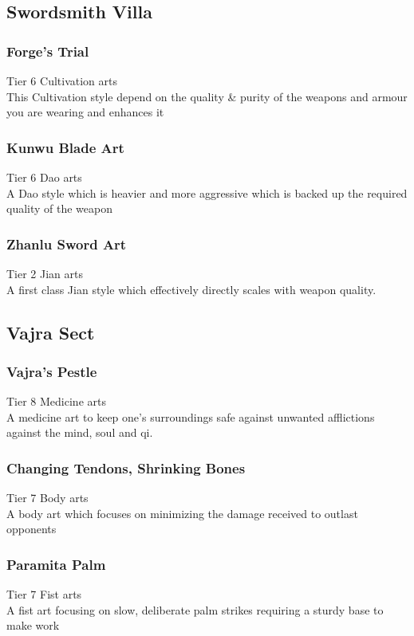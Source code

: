 \subsubsection{}

\subsection{Swordsmith Villa}
\subsubsection{Forge's Trial}
Tier 6 Cultivation arts\\
This Cultivation style depend on the quality \& purity of the weapons and armour you are wearing and enhances it

\subsubsection{Kunwu Blade Art}
Tier 6 Dao arts\\
A Dao style which is heavier and more aggressive which is backed up the required quality of the weapon

\subsubsection{Zhanlu Sword Art}
Tier 2 Jian arts\\
A first class Jian style which effectively directly scales with weapon quality.

\subsection{Vajra Sect}
\subsubsection{Vajra's Pestle}
Tier 8 Medicine arts \\
A medicine art to keep one's surroundings safe against unwanted afflictions against the mind, soul and qi.

\subsubsection{Changing Tendons, Shrinking Bones}
Tier 7 Body arts \\
A body art which focuses on minimizing the damage received to outlast opponents 

\subsubsection{Paramita Palm}
Tier 7 Fist arts\\
A fist art focusing on slow, deliberate palm strikes requiring a sturdy base to make work

